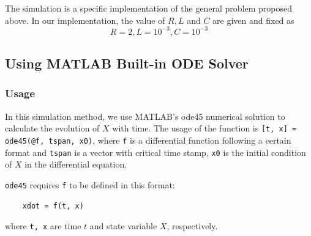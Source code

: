 \documentclass{article}
\begin{document}
  The simulation is a specific implementation of the general problem proposed above. In our implementation, the value of $R, L$ and $C$ are given and fixed as $$R = 2, L = 10^{-3}, C = 10^{-3}$$

  \subsection{Using MATLAB Built-in ODE Solver}
  \subsubsection{Usage}
  In this simulation method, we use MATLAB's ode45 numerical solution to calculate the evolution of $X$ with time. The usage of the function is \verb+[t, x] = ode45(@f, tspan, x0)+, where \verb+f+ is a differential function following a certain format and \verb+tspan+ is a vector with critical time stamp, \verb+x0+ is the initial condition of $X$ in the differential equation.\par
  \verb+ode45+ requires \verb+f+ to be defined in this format: 
  \begin{lstlisting}
    xdot = f(t, x)
  \end{lstlisting}
  where \verb+t, x+ are time $t$ and state variable $X$, respectively.
\end{document}

